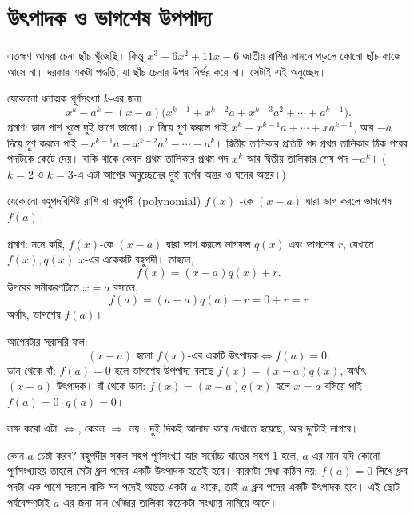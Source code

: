 \documentclass[11pt]{article}
\begin{document}
\section{উৎপাদক ও ভাগশেষ উপপাদ্য}

\noindent
এতক্ষণ আমরা চেনা ছাঁচ খুঁজেছি। কিন্তু $x^{3} - 6x^{2} + 11x - 6$ জাতীয় রাশির
সামনে পড়লে কোনো ছাঁচ কাজে আসে না। দরকার একটা পদ্ধতি, যা ছাঁচ চেনার উপর নির্ভর
করে না। সেটাই এই অনুচ্ছেদ।

\begin{idea}
যেকোনো ধনাত্মক পূর্ণসংখ্যা $k$-এর জন্য
\[
  x^{k} - a^{k} = (x - a)\big( x^{k-1} + x^{k-2}a + x^{k-3}a^{2} + \cdots + a^{k-1} \big).
\]
প্রমাণ: ডান পাশ খুলে দুই ভাগে ভাবো। $x$ দিয়ে গুণ করলে পাই
$x^{k} + x^{k-1}a + \cdots + xa^{k-1}$, আর $-a$ দিয়ে গুণ করলে পাই
$-x^{k-1}a - x^{k-2}a^{2} - \cdots - a^{k}$। দ্বিতীয় তালিকার প্রতিটি পদ প্রথম
তালিকার ঠিক পরের পদটিকে কেটে দেয়। বাকি থাকে কেবল প্রথম তালিকার প্রথম পদ $x^{k}$
আর দ্বিতীয় তালিকার শেষ পদ $-a^{k}$। ($k=2$ ও $k=3$-এ এটা আগের অনুচ্ছেদের দুই
বর্গের অন্তর ও ঘনের অন্তর।)
\end{idea}

\begin{idea}[ভাগশেষ উপপাদ্য]
যেকোনো বহুপদবিশিষ্ট রাশি বা বহুপদী (polynomial) $f(x)$ -কে $(x-a)$ দ্বারা ভাগ করলে ভাগশেষ $f(a)$।

প্রমাণ: মনে করি, $f(x)$-কে $(x-a)$ দ্বারা ভাগ করলে ভাগফল $q(x)$ এবং ভাগশেষ $r$, যেখানে $f(x), q(x)$ $x$-এর একেকটি বহুপদী। তাহলে,
\[
  f(x)=(x-a)q(x)+r.
\]
উপরের সমীকরণটিতে $x=a$ বসালে,
\[
  f(a)=(a-a)q(a)+r=0+r=r
\]
অর্থাৎ, ভাগশেষ $f(a)$।
\end{idea}

\begin{idea}
আগেরটার সরাসরি ফল:
\[
  (x - a) \text{ হলো } f(x)\text{-এর একটি উৎপাদক} \iff f(a) = 0 .
\]
ডান থেকে বাঁ: $f(a) = 0$ হলে ভাগশেষ উপপাদ্য বলছে $f(x) = (x-a)q(x)$, অর্থাৎ
$(x-a)$ উৎপাদক। বাঁ থেকে ডান: $f(x) = (x-a)q(x)$ হলে $x = a$ বসিয়ে পাই
$f(a) = 0 \cdot q(a) = 0$।

লক্ষ করো এটা $\Leftrightarrow$, কেবল $\Rightarrow$ নয় : দুই দিকই আলাদা করে
দেখাতে হয়েছে, আর দুটোই লাগবে।
\end{idea}

\begin{remark}
কোন $a$ চেষ্টা করব? বহুপদীর সকল সহগ পূর্ণসংখ্যা আর সর্বোচ্চ ঘাতের সহগ $1$ হলে, $a$ এর মান যদি কোনো
পূর্ণসংখ্যাহয় তাহলে সেটা ধ্রুব পদের একটি উৎপাদক হতেই হবে। কারণটা দেখা কঠিন নয়:
$f(a) = 0$ লিখে ধ্রুব পদটা এক পাশে সরালে বাকি সব পদেই অন্তত একটা $a$ থাকে, তাই
$a$ ধ্রুব পদের একটি উৎপাদক হবে। এই ছোট পর্যবেক্ষণটাই $a$ এর জন্য মান খোঁজার তালিকা কয়েকটা সংখ্যায় নামিয়ে আনে।
 \end{remark}
\end{document}
